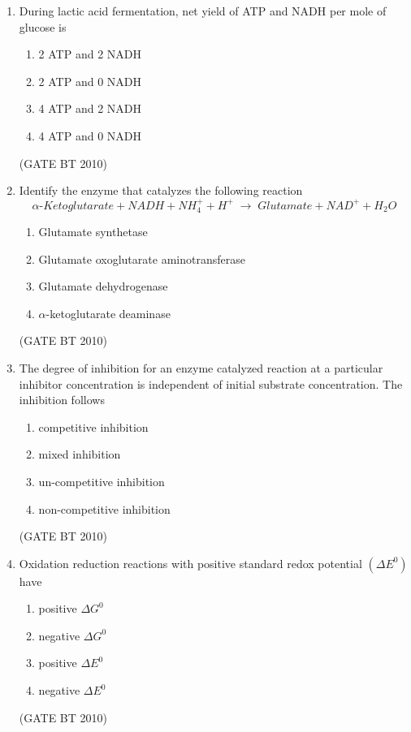 \documentclass[journal,12pt,onecolumn]{IEEEtran}
\theoremstyle{remark}
\begin{document}
\begin{enumerate}
\item During lactic acid fermentation, net yield of ATP and NADH per mole of glucose is  
\begin{enumerate}
   \item 2 ATP and 2 NADH  
   \item 2 ATP and 0 NADH  
   \item 4 ATP and 2 NADH  
   \item 4 ATP and 0 NADH  
\end{enumerate}
\hfill (GATE BT 2010)

\item Identify the enzyme that catalyzes the following reaction  
\[
\alpha\text{-}Ketoglutarate + NADH + NH_{4}^{+} + H^{+}
\;\longrightarrow\;
Glutamate + NAD^{+} + H_{2}O
\]

\begin{enumerate}
   \item Glutamate synthetase  
   \item Glutamate oxoglutarate aminotransferase  
   \item Glutamate dehydrogenase  
   \item $\alpha$-ketoglutarate deaminase  
\end{enumerate}
\hfill (GATE BT 2010)

\item The degree of inhibition for an enzyme catalyzed reaction at a particular inhibitor concentration is independent of initial substrate concentration. The inhibition follows  
\begin{enumerate}
   \item competitive inhibition  
   \item mixed inhibition  
   \item un-competitive inhibition  
   \item non-competitive inhibition  
\end{enumerate}
\hfill (GATE BT 2010)

\item Oxidation reduction reactions with positive standard redox potential $(\Delta E^{0})$ have  
\begin{enumerate}
   \item positive $\Delta G^{0}$  
   \item negative $\Delta G^{0}$  
   \item positive $\Delta E^{0}$  
   \item negative $\Delta E^{0}$  
\end{enumerate}
\hfill (GATE BT 2010)


\end{enumerate}
\end{document}
